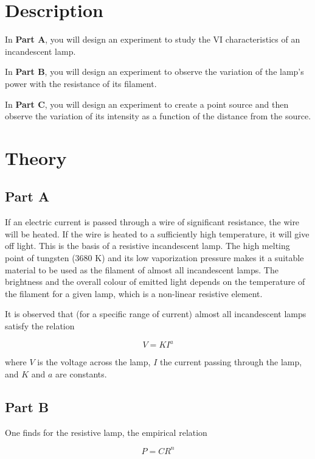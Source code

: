 \section*{Description}

In \textbf{Part A}, you will design an experiment to study the VI characteristics of an incandescent lamp. 

In \textbf{Part B}, you will design an experiment to observe the variation of the lamp's power with the resistance of its filament. 

In \textbf{Part C}, you will design an experiment to create a point source and then observe the variation of its intensity as a function of the distance from the source. 


\section*{Theory}

\subsection*{Part A}

If an electric current is passed through a wire of significant resistance, the wire will be heated. If the wire is heated to a sufficiently high temperature, it will give off light.  This is the basis of a resistive incandescent lamp. The high melting point of tungsten (3680 K) and its low vaporization pressure makes it a suitable material to be used as the filament of almost all incandescent lamps. The brightness and the overall colour of emitted light depends on the temperature of the filament for a given lamp, which is a non-linear resistive element.

It is observed that (for a specific range of current) almost all incandescent lamps satisfy the relation

\begin{equation*}
V = K I^a
\end{equation*}

where $V$ is the voltage across the lamp, $I$ the current passing through the lamp, and $K$ and $a$ are constants.

\subsection*{Part B}


One finds for the resistive lamp, the empirical relation

\begin{equation*}
P = C R^n
\end{equation*}


